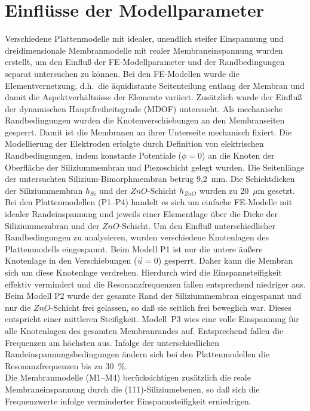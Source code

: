 \section{Einflüsse der Modellparameter}
\label{piezomodell}

Verschiedene Plattenmodelle mit idealer, unendlich steifer Einspannung
und dreidimensionale Membranmodelle mit realer Membraneinspannung
wurden erstellt, um den Einfluß der FE-Modellparameter und der
Randbedingungen separat untersuchen zu können.
Bei den FE-Modellen wurde die Elementvernetzung, d.h.\ die äquidistante
Seitenteilung entlang der Membran und damit die Aspektverhältnisse der
Elemente variiert. Zusätzlich wurde der Einfluß der dynamischen
Hauptfreiheitsgrade (MDOF) untersucht. Als mechanische Randbedingungen
wurden die Knotenverschiebungen an den Membranseiten gesperrt. Damit ist
die Membranen an ihrer Unterseite mechanisch fixiert. Die Modellierung
der Elektroden erfolgte durch Definition von elektrischen Randbedingungen,
indem konstante Potentiale ($\phi = 0$) an die Knoten der Oberfläche der
Siliziummembran und Piezoschicht gelegt wurden. Die Seitenlänge der
untersuchten Silizium-Bimorphmembran betrug 9,2~mm. Die Schichtdicken
der Siliziummembran $h_{Si}$ und der $ZnO$-Schicht $h_{ZnO}$ wurden
zu 20~$\mu$m gesetzt.\\
%
Bei den Plattenmodellen (P1--P4) handelt es sich um einfache FE-Modelle
mit idealer Randeinspannung und jeweils einer Elementlage über die Dicke
der Siliziummembran und der $ZnO$-Schicht.
Um den Einfluß unterschiedlicher Randbedingungen zu analysieren, wurden
verschiedene Knotenlagen des Plattenmodells eingespannt. Beim Modell P1 ist
nur die untere äußere Knotenlage in den Verschiebungen ($\vec u=0$) gesperrt.
Daher kann die Membran sich um diese Knotenlage verdrehen. Hierdurch wird
die Einspannsteifigkeit effektiv vermindert und die Resonanzfrequenzen
fallen entsprechend niedriger aus. Beim Modell P2 wurde der gesamte Rand der
Siliziummembran eingespannt und nur die $ZnO$-Schicht frei gelassen, so daß
sie seitlich frei beweglich war. Dieses entspricht einer mittleren
Steifigkeit. Modell~P3 wies eine volle Einspannung für alle Knotenlagen des
gesamten Membranrandes auf. Entsprechend fallen die Frequenzen am höchsten
aus. Infolge der unterschiedlichen Randeinspannungsbedingungen ändern sich
bei den Plattenmodellen die Resonanzfrequenzen bis zu 30~\%. \\
%
Die Membranmodelle (M1--M4) berücksichtigen zusätzlich die reale
Membraneinspannung durch die (111)-Siliziumebenen, so daß sich die
Frequenzwerte infolge verminderter Einspannsteifigkeit erniedrigen.
